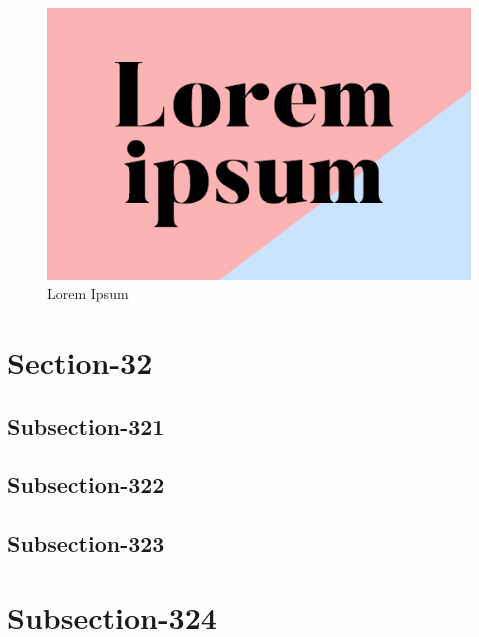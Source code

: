 \documentclass[a4paper,10pt]{report}
\begin{document}
\blindtext %

\begin{figure}[h]
  \center
  \includegraphics[width=0.85\linewidth]{lorem}
  \caption{Lorem Ipsum}
  \label{fig:{lorem}}
\end{figure}


\section{Section-32}\label{sec:section-32}
\subsection{Subsection-321}\label{subsec:subsection-321}

\blindtext %


\subsection{Subsection-322}\label{subsec:subsection-322}

\blindtext %


\subsection{Subsection-323}\label{subsec:subsection-323}

\blindtext %


\section{Subsection-324}\label{sec:subsection-324}

\blindtext %
\end{document}
